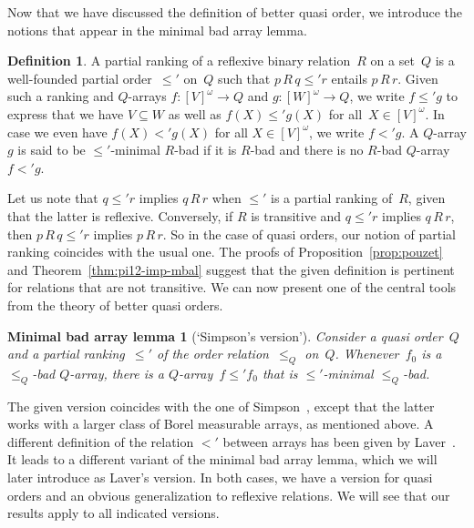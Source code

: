 \documentclass{amsart}
\numberwithin{theorem}{section}
\newtheorem*{min-bad-arr-lem}{Minimal bad array lemma}
\theoremstyle{definition}
\newtheorem{definition}[theorem]{Definition}
\begin{document}
Now that we have discussed the definition of better quasi order, we introduce the notions that appear in the minimal bad array lemma.

\begin{definition}\label{def:minimal-bad}
A partial ranking of a reflexive binary relation~$R$ on a set~$Q$ is a well-founded partial order~$\leq'$ on~$Q$ such that $p\,R\,q\leq'r$ entails $p\,R\,r$. Given such a ranking and $Q$-arrays $f:[V]^\omega\to Q$ and $g:[W]^\omega\to Q$, we write $f\leq' g$ to express that we have $V\subseteq W$ as well as $f(X)\leq'g(X)$ for all~$X\in[V]^\omega$. In case we even have $f(X)<'g(X)$ for all $X\in[V]^\omega$, we write $f<'g$. A $Q$-array $g$ is said to be $\leq'$-minimal $R$-bad if it is $R$-bad and there is no $R$-bad $Q$-array $f<'g$.
\end{definition}

Let us note that $q\leq'r$ implies $q\,R\,r$ when $\leq'$ is a partial ranking of~$R$, given that the latter is reflexive. Conversely, if $R$ is transitive and $q\leq'r$ implies $q\,R\,r$, then $p\,R\,q\leq'r$ implies $p\,R\,r$. So in the case of quasi orders, our notion of partial ranking coincides with the usual one. The proofs of Proposition~\ref{prop:pouzet} and Theorem~\ref{thm:pi12-imp-mbal} suggest that the given definition is pertinent for relations that are not transitive. We can now present one of the central tools from the theory of better quasi orders.

\begin{min-bad-arr-lem}[`Simpson's version']
Consider a quasi order~$Q$ and a partial ranking~$\leq'$ of the order relation~$\leq_Q$ on~$Q$. Whenever~$f_0$ is a $\leq_Q$-bad $Q$-array, there is a $Q$-array~$f\leq'f_0$ that is $\leq'$-minimal $\leq_Q$-bad.
\end{min-bad-arr-lem}

The given version coincides with the one of Simpson~\cite{simpson-borel-bqos}, except that the latter works with a larger class of Borel measurable arrays, as mentioned above. A different definition of the relation $<'$ between arrays has been given by Laver~\cite{laver-min-array}. It leads to a different variant of the minimal bad array lemma, which we will later introduce as Laver's version. In both cases, we have a version for quasi orders and an obvious generalization to reflexive relations. We will see that our results apply to all indicated versions.
\end{document}

